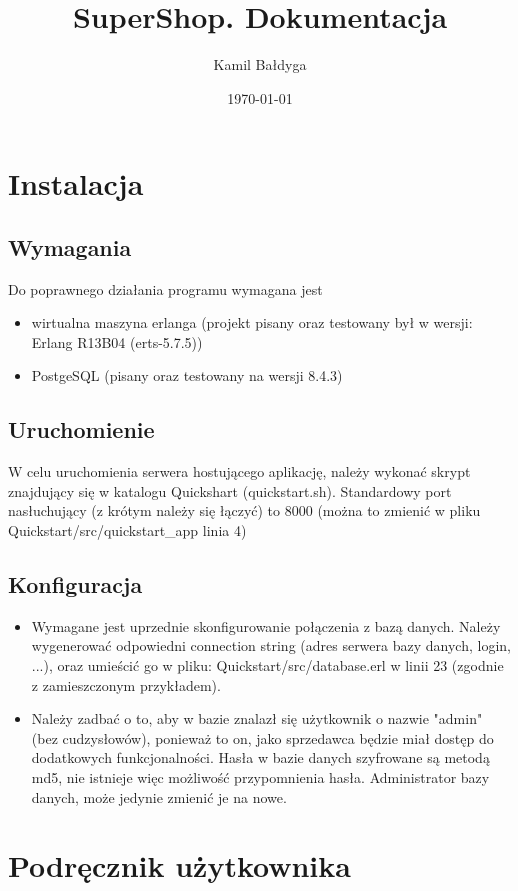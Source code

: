 \documentclass[12pt]{article}
\title{SuperShop. Dokumentacja}
\date{\today}
\author{Kamil Bałdyga}
\begin{document}
  \maketitle \newpage

\section{Instalacja}
  \subsection{Wymagania}
	Do poprawnego działania programu wymagana jest
	\begin {itemize}
		\item wirtualna maszyna erlanga (projekt pisany oraz testowany był w wersji: Erlang R13B04 (erts-5.7.5))
		\item PostgeSQL (pisany oraz testowany na wersji 8.4.3)
	\end{itemize}
  \subsection{Uruchomienie}
	W celu uruchomienia serwera hostującego aplikację, należy wykonać skrypt znajdujący się w katalogu Quickshart (quickstart.sh). Standardowy port nasłuchujący (z krótym należy się łączyć) to 8000 (można to zmienić w pliku Quickstart/src/quickstart\_app linia 4)
  \subsection{Konfiguracja}
	\begin{itemize}
		\item Wymagane jest uprzednie skonfigurowanie połączenia z bazą danych. Należy wygenerować odpowiedni connection string (adres serwera bazy danych, login, ...), oraz umieścić go w pliku: Quickstart/src/database.erl w linii 23 (zgodnie z zamieszczonym przykładem).
		\item Należy zadbać o to, aby w bazie znalazł się użytkownik o nazwie "admin" (bez cudzysłowów), ponieważ to on, jako sprzedawca będzie miał dostęp do dodatkowych funkcjonalności. Hasła w bazie danych szyfrowane są metodą md5, nie istnieje więc możliwość przypomnienia hasła. Administrator bazy danych, może jedynie zmienić je na nowe.
	\end{itemize}
 
\section{Podręcznik użytkownika}
\end{document}

